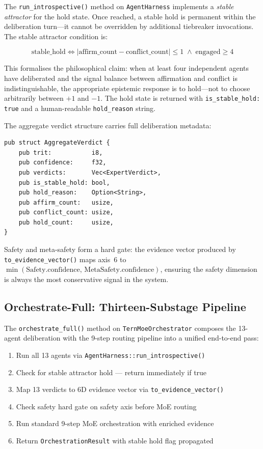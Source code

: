\documentclass[journal,10pt,twocolumn]{IEEEtran}
\begin{document}
The \texttt{run\_introspective()} method on \texttt{AgentHarness} implements a
\emph{stable attractor} for the hold state. Once reached, a stable hold is
permanent within the deliberation turn—it cannot be overridden by additional
tiebreaker invocations. The stable attractor condition is:

\begin{equation}
  \text{stable\_hold} \iff
  \lvert \text{affirm\_count} - \text{conflict\_count} \rvert \leq 1
  \;\wedge\;
  \text{engaged} \geq 4
  \label{eq:stable_hold}
\end{equation}

This formalises the philosophical claim: when at least four independent
agents have deliberated and the signal balance between affirmation and
conflict is indistinguishable, the appropriate epistemic response is to
hold—not to choose arbitrarily between $+1$ and $-1$. The hold state
is returned with \texttt{is\_stable\_hold: true} and a human-readable
\texttt{hold\_reason} string.

The aggregate verdict structure carries full deliberation metadata:

\begin{lstlisting}[caption={AggregateVerdict fields}]
pub struct AggregateVerdict {
    pub trit:           i8,
    pub confidence:     f32,
    pub verdicts:       Vec<ExpertVerdict>,
    pub is_stable_hold: bool,
    pub hold_reason:    Option<String>,
    pub affirm_count:   usize,
    pub conflict_count: usize,
    pub hold_count:     usize,
}
\end{lstlisting}

Safety and meta-safety form a hard gate: the evidence vector produced by
\texttt{to\_evidence\_vector()} maps axis~6 to
$\min(\text{Safety.confidence},\, \text{MetaSafety.confidence})$, ensuring
the safety dimension is always the most conservative signal in the system.

\subsection{Orchestrate-Full: Thirteen-Substage Pipeline}
\label{subsec:orchestrate_full}

The \texttt{orchestrate\_full()} method on \texttt{TernMoeOrchestrator}
composes the 13-agent deliberation with the 9-step routing pipeline into a
unified end-to-end pass:

\begin{enumerate}
  \item Run all 13 agents via \texttt{AgentHarness::run\_introspective()}
  \item Check for stable attractor hold — return immediately if true
  \item Map 13 verdicts to 6D evidence vector via \texttt{to\_evidence\_vector()}
  \item Check safety hard gate on safety axis before MoE routing
  \item Run standard 9-step MoE orchestration with enriched evidence
  \item Return \texttt{OrchestrationResult} with stable hold flag propagated
\end{enumerate}
\end{document}
